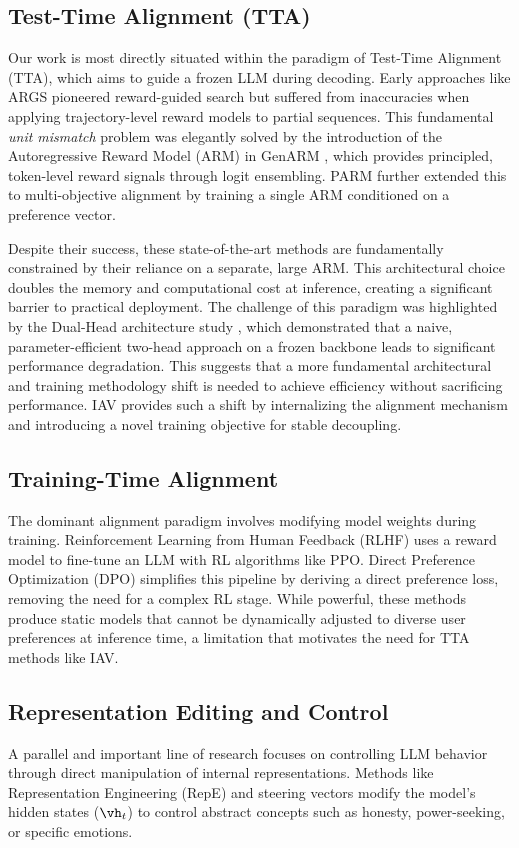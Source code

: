 \documentclass{article}
\begin{document}
\subsection{Test-Time Alignment (TTA)}
Our work is most directly situated within the paradigm of Test-Time Alignment (TTA), which aims to guide a frozen LLM during decoding. Early approaches like ARGS \citep{args2024} pioneered reward-guided search but suffered from inaccuracies when applying trajectory-level reward models to partial sequences. This fundamental \textit{unit mismatch} problem was elegantly solved by the introduction of the Autoregressive Reward Model (ARM) in GenARM \citep{genarm2025}, which provides principled, token-level reward signals through logit ensembling. PARM \citep{parm2025} further extended this to multi-objective alignment by training a single ARM conditioned on a preference vector.

Despite their success, these state-of-the-art methods are fundamentally constrained by their reliance on a separate, large ARM. This architectural choice doubles the memory and computational cost at inference, creating a significant barrier to practical deployment. The challenge of this paradigm was highlighted by the Dual-Head architecture study \citep{dualhead2025}, which demonstrated that a naive, parameter-efficient two-head approach on a frozen backbone leads to significant performance degradation. This suggests that a more fundamental architectural and training methodology shift is needed to achieve efficiency without sacrificing performance. IAV provides such a shift by internalizing the alignment mechanism and introducing a novel training objective for stable decoupling.

\subsection{Training-Time Alignment}
The dominant alignment paradigm involves modifying model weights during training. Reinforcement Learning from Human Feedback (RLHF) \citep{rlhf2022} uses a reward model to fine-tune an LLM with RL algorithms like PPO. Direct Preference Optimization (DPO) \citep{dpo2023} simplifies this pipeline by deriving a direct preference loss, removing the need for a complex RL stage. While powerful, these methods produce static models that cannot be dynamically adjusted to diverse user preferences at inference time, a limitation that motivates the need for TTA methods like IAV.

\subsection{Representation Editing and Control}
A parallel and important line of research focuses on controlling LLM behavior through direct manipulation of internal representations. Methods like Representation Engineering (RepE) \citep{zou2023representation} and steering vectors \citep{turner2023steering} modify the model's hidden states ($\vh_t$) to control abstract concepts such as honesty, power-seeking, or specific emotions.
\end{document}
